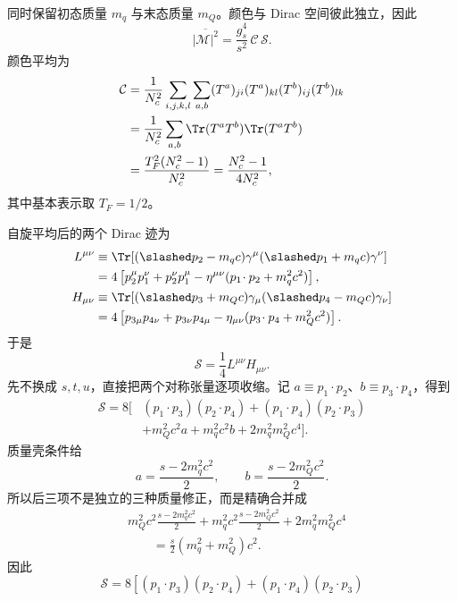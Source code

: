 \begin{derivation}[夸克对湮灭的振幅平方]
同时保留初态质量 $m_q$ 与末态质量 $m_Q$。颜色与 Dirac 空间彼此独立，因此
\begin{equation*}
 \overline{|\mathcal M|^2}
 =\frac{g_s^4}{s^2}\,\mathcal C\,\mathcal S.
\end{equation*}
颜色平均为
\begin{align*}
\mathcal C
&=\frac1{N_c^2}
\sum_{i,j,k,l}\sum_{a,b}
(T^a)_{ji}(T^a)_{kl}
(T^b)_{ij}(T^b)_{lk}\\
&=\frac1{N_c^2}
\sum_{a,b}\Tr(T^aT^b)\Tr(T^aT^b)\\
&=\frac{T_F^2(N_c^2-1)}{N_c^2}
=\frac{N_c^2-1}{4N_c^2},
\end{align*}
其中基本表示取 $T_F=1/2$。

自旋平均后的两个 Dirac 迹为
\begin{align*}
 L^{\mu\nu}
 &\equiv\Tr[(\slashed p_2-m_qc)\gamma^\mu
 (\slashed p_1+m_qc)\gamma^\nu]\\
 &=4\left[p_2^\mu p_1^\nu+p_2^\nu p_1^\mu
 -\eta^{\mu\nu}(p_1\!\cdot p_2+m_q^2c^2)\right],\\
 H_{\mu\nu}
 &\equiv\Tr[(\slashed p_3+m_Qc)\gamma_\mu
 (\slashed p_4-m_Qc)\gamma_\nu]\\
 &=4\left[p_{3\mu}p_{4\nu}+p_{3\nu}p_{4\mu}
 -\eta_{\mu\nu}(p_3\!\cdot p_4+m_Q^2c^2)\right].
\end{align*}
于是
\begin{equation*}
 \mathcal S=\frac14L^{\mu\nu}H_{\mu\nu}.
\end{equation*}
先不换成 $s,t,u$，直接把两个对称张量逐项收缩。记
$a\equiv p_1\!\cdot p_2$、$b\equiv p_3\!\cdot p_4$，得到
\begin{align*}
\mathcal S
=8\Big[&
(p_1\!\cdot p_3)(p_2\!\cdot p_4)
+(p_1\!\cdot p_4)(p_2\!\cdot p_3)\\
&+m_Q^2c^2 a+m_q^2c^2 b
+2m_q^2m_Q^2c^4\Big].
\end{align*}
质量壳条件给
\begin{equation*}
a=\frac{s-2m_q^2c^2}{2},
\qquad
b=\frac{s-2m_Q^2c^2}{2}.
\end{equation*}
所以后三项不是独立的三种质量修正，而是精确合并成
\begin{align*}
&m_Q^2c^2\frac{s-2m_q^2c^2}{2}
+m_q^2c^2\frac{s-2m_Q^2c^2}{2}
+2m_q^2m_Q^2c^4\\
&\qquad=\frac{s}{2}(m_q^2+m_Q^2)c^2.
\end{align*}
因此
\begin{equation*}
 \mathcal S
 =8\left[
 (p_1\!\cdot p_3)(p_2\!\cdot p_4)
 +(p_1\!\cdot p_4)(p_2\!\cdot p_3)

\end{equation*}
\end{derivation}
